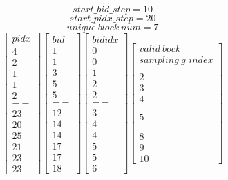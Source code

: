 \documentclass[,table,dvipsnames]{article}
\begin{document}
$$ start\_bid\_step=10 $$
$$ start\_pidx\_step=20 $$
$$ unique\ block\ num=7 $$
\[  
\begin{bmatrix}
pidx \\ 4 \\ 2 \\ 1 \\ 1 \\2 \\-- \\23 \\20 \\ 25\\21 \\23\\23
\end{bmatrix}
\begin{bmatrix}
bid \\ 1 \\ 1 \\ 3 \\ 5 \\ 5  \\--  \\12 \\14\\14\\17\\17\\18
\end{bmatrix}
\begin{bmatrix}
bididx \\ 0 \\ 0 \\ 1 \\ 2 \\2 \\-- \\3\\4\\4\\5\\5\\6
\end{bmatrix}
\begin{bmatrix}
valid\ bock\\ sampling\ g\_index \\\\2\\3\\4\\--\\5\\ \\ \\8\\9\\10
\end{bmatrix}
\]
\end{document}
